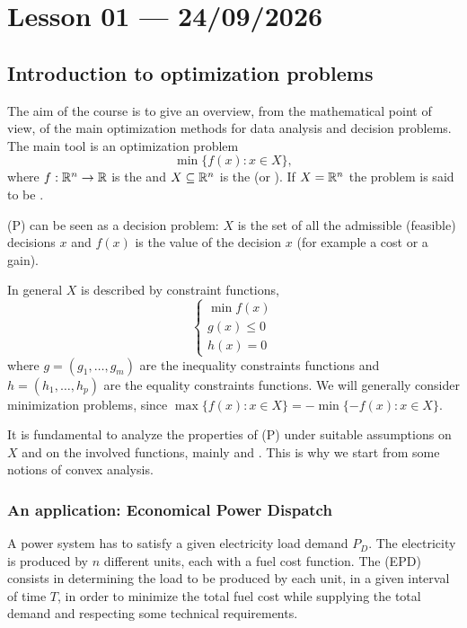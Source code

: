 \section{Lesson 01 --- 24/09/2026}

\subsection{Introduction to optimization problems}

The aim of the course is to give an overview, from the mathematical point of view, of the main optimization methods for data analysis and decision problems. The main tool is an optimization problem
\[
    \min \{ f(x) : x \in X \}, \tag{P}
\]
where $f: \mathbb{R}^n \to \mathbb{R}$ is the  and $X \subseteq \mathbb{R}^n$ is the  (or ). If $X = \mathbb{R}^n$ the problem is said to be .

\begin{remark}
(P) can be seen as a decision problem: $X$ is the set of all the admissible (feasible) decisions $x$ and $f(x)$ is the value of the decision $x$ (for example a cost or a gain).
\end{remark}

In general $X$ is described by constraint functions,
\[
    \begin{cases}
        \min f(x)\\
        g(x) \le 0\\
        h(x) = 0
    \end{cases}
\]
where $g = (g_1, \dots, g_m)$ are the inequality constraints functions and $h = (h_1, \dots, h_p)$ are the equality constraints functions. We will generally consider minimization problems, since $\max\{f(x) : x \in X\} = -\min\{-f(x) : x \in X\}$.

It is fundamental to analyze the properties of (P) under suitable assumptions on $X$ and on the involved functions, mainly  and . This is why we start from some notions of convex analysis.

\subsubsection{An application: Economical Power Dispatch}

A power system has to satisfy a given electricity load demand $P_D$. The electricity is produced by $n$ different units, each with a fuel cost function. The  (EPD) consists in determining the load to be produced by each unit, in a given interval of time $T$, in order to minimize the total fuel cost while supplying the total demand and respecting some technical requirements.

